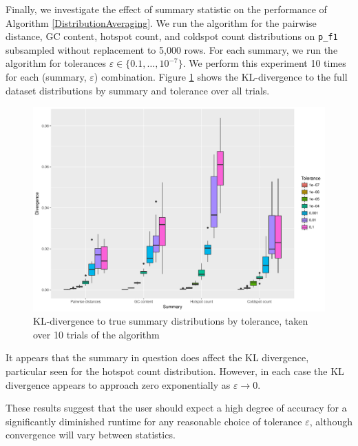 \documentclass{article}
\begin{document}
Finally, we investigate the effect of summary statistic on the performance of Algorithm \ref{DistributionAveraging}.
We run the algorithm for the pairwise distance, GC content, hotspot count, and coldspot count distributions on \texttt{p\_f1} subsampled without replacement to 5,000 rows.
For each summary, we run the algorithm for tolerances $\varepsilon \in \{0.1, \dotsc, 10^{-7}\}$.
We perform this experiment 10 times for each (summary, $\varepsilon$) combination.
Figure \ref{fig:SummaryPerformance} shows the KL-divergence to the full dataset distributions by summary and tolerance over all trials.
\begin{figure}
    \includegraphics[width=\linewidth]{Figures/div_by_summary_and_tol.pdf}
    \caption{KL-divergence to true summary distributions by tolerance, taken over 10 trials of the algorithm}
    \label{fig:SummaryPerformance}
\end{figure}
It appears that the summary in question does affect the KL divergence, particular seen for the hotspot count distribution.
However, in each case the KL divergence appears to approach zero exponentially as $\varepsilon \to 0$. 

These results suggest that the user should expect a high degree of accuracy for a significantly diminished runtime for any reasonable choice of tolerance $\varepsilon$, although convergence will vary between statistics.
\end{document}
